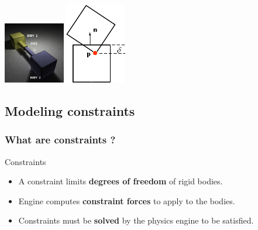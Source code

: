 \documentclass{beamer}
\begin{document}
\begin{frame}
\begin{center}
   \includegraphics[width = 0.2\textwidth]{slider.png}
   \includegraphics[width = 0.2\textwidth]{collision.png}
\end{center}
\end{frame}
\subsection{Modeling constraints}
\begin{frame}
 \frametitle{What are constraints ?}
 \begin{block}{Constraints}
  \begin{itemize}
    \item A constraint limits \textbf{degrees of freedom} of rigid bodies. \pause
    \item Engine computes \textbf{constraint forces} to apply to the bodies.
    \item Constraints must be \textbf{solved} by the physics engine to be satisfied.
  \end{itemize}
  \end{block}
\end{frame}
\end{document}
